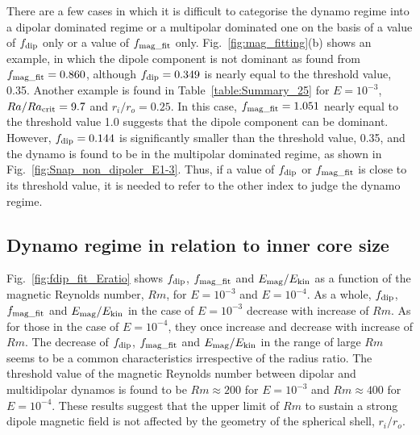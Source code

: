 There are a few cases in which it is difficult to categorise the dynamo regime into a dipolar dominated regime or a multipolar dominated one on the basis of a value of $f_{\rm dip}$ only or a value of $f_{\rm mag\_fit}$ only.
Fig.~\ref{fig:mag_fitting}(b) shows an example, in which the dipole component is not dominant as found from $f_{\rm mag\_fit} = 0.860$, although $f_{\rm dip} = 0.349$ is nearly equal to the threshold value, 0.35.
Another example is found in Table~\ref{table:Summary_25} for $E = 10^{-3}$, $Ra / Ra_{\rm crit} = 9.7$ and $r_i / r_o = 0.25$.
In this case, $f_{\rm mag\_fit} = 1.051$ nearly equal to the threshold value 1.0 suggests that the dipole component can be dominant.
However, $f_{\rm dip} = 0.144$ is significantly smaller than the threshold value, 0.35, and the dynamo is found to be in the multipolar dominated regime, as shown in Fig.~\ref{fig:Snap_non_dipoler_E1-3}.
Thus, if a value of $f_{\rm dip}$ or $f_{\rm mag\_fit}$ is close to its threshold value, it is needed to refer to the other index to judge the dynamo regime.
%



\subsection{Dynamo regime in relation to inner core size}
\label{subsec:dynamo_regime}

Fig.~\ref{fig:fdip_fit_Eratio} shows $f_{\rm dip}$, $f_{\rm mag\_fit}$ and $E_{\rm mag} / E_{\rm kin}$ as a function of the magnetic Reynolds number, $Rm$, for $E = 10^{-3}$ and $E = 10^{-4}$.
As a whole, $f_{\rm dip}$, $f_{\rm mag\_fit}$ and $E_{\rm mag} / E_{\rm kin}$ in the case of $E = 10^{-3}$ decrease with increase of $Rm$.
As for those in the case of $E = 10^{-4}$, they once increase and decrease with increase of $Rm$.
The decrease of $f_{\rm dip}$, $f_{\rm mag\_fit}$ and $E_{\rm mag} / E_{\rm kin}$ in the range of large $Rm$ seems to be a common characteristics irrespective of the radius ratio.
The threshold value of the magnetic Reynolds number between dipolar and multidipolar dynamos is found to be $Rm \approx 200$ for $E = 10^{-3}$ and $Rm \approx 400$ for $E = 10^{-4}$.
These results suggest that the upper limit of $Rm$ to sustain a strong dipole magnetic field is not affected by the geometry of the spherical shell, $r_i / r_o$.



